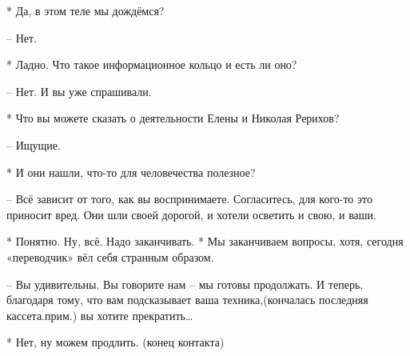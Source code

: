  * Да, в этом теле мы дождёмся?

 – Нет.

 * Ладно. Что такое информационное кольцо и есть ли оно?

 – Нет. И вы уже спрашивали.

 * Что вы можете сказать о деятельности Елены и Николая Рерихов?

 – Ищущие.

 * И они нашли, что-то для человечества полезное?

 – Всё зависит от того, как вы воспринимаете. Согласитесь, для кого-то это приносит вред. Они шли своей дорогой, и хотели осветить и свою, и ваши.

 * Понятно. Ну, всё. Надо заканчивать.
 * Мы заканчиваем вопросы, хотя, сегодня «переводчик» вёл себя странным образом.

 – Вы удивительны. Вы говорите нам – мы готовы продолжать. И теперь, благодаря тому, что вам подсказывает ваша техника,(кончалась последняя кассета.прим.) вы хотите прекратить…

 * Нет, ну можем продлить. 
 (конец контакта) 